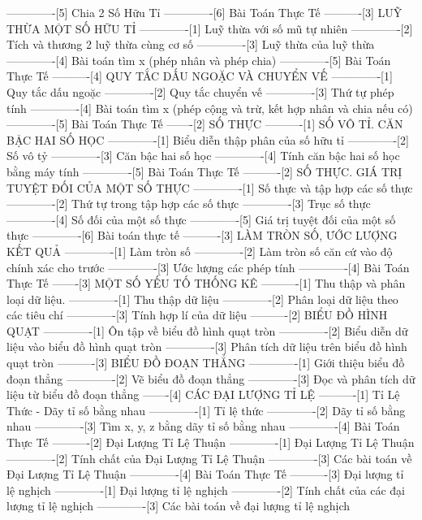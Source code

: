 -------------[5] Chia 2 Số Hữu Tỉ
-------------[6] Bài Toán Thực Tế
----------[3] LUỸ THỪA MỘT SỐ HỮU TỈ
-------------[1] Luỹ thừa với số mũ tự nhiên
-------------[2] Tích và thương 2 luỹ thừa cùng cơ số
-------------[3] Luỹ thừa của luỹ thừa
-------------[4] Bài toán tìm x (phép nhân và phép chia)
-------------[5] Bài Toán Thực Tế
----------[4] QUY TẮC DẤU NGOẶC VÀ CHUYỂN VẾ
-------------[1] Quy tắc dấu ngoặc
-------------[2] Quy tắc chuyển vế
-------------[3] Thứ tự phép tính
-------------[4] Bài toán tìm x (phép cộng và trừ, kết hợp nhân và chia nếu có)
-------------[5] Bài Toán Thực Tế
-------[2] SỐ THỰC
----------[1] SỐ VÔ TỈ. CĂN BẬC HAI SỐ HỌC
-------------[1] Biểu diễn thập phân của số hữu tỉ
-------------[2] Số vô tỷ
-------------[3] Căn bậc hai số học
-------------[4] Tính căn bậc hai số học bằng máy tính
-------------[5] Bài Toán Thực Tế
----------[2] SỐ THỰC. GIÁ TRỊ TUYỆT ĐỐI CỦA MỘT SỐ THỰC
-------------[1] Số thực và tập hợp các số thực
-------------[2] Thứ tự trong tập hợp các số thực
-------------[3] Trục số thực
-------------[4] Số đối của một số thực
-------------[5] Giá trị tuyệt đối của một số thực
-------------[6] Bài toán thực tế
----------[3] LÀM TRÒN SỐ, ƯỚC LƯỢNG KẾT QUẢ
-------------[1] Làm tròn số
-------------[2] Làm tròn số căn cứ vào độ chính xác cho trước
-------------[3] Ước lượng các phép tính
-------------[4] Bài Toán Thực Tế
-------[3] MỘT SỐ YẾU TỐ THỐNG KÊ
----------[1] Thu thập và phân loại dữ liệu.
-------------[1] Thu thập dữ liệu
-------------[2] Phân loại dữ liệu theo các tiêu chí
-------------[3] Tính hợp lí của dữ liệu
----------[2] BIỂU ĐỒ HÌNH QUẠT
-------------[1] Ôn tập về biểu đồ hình quạt tròn
-------------[2] Biểu diễn dữ liệu vào biểu đồ hình quạt tròn
-------------[3] Phân tích dữ liệu trên biểu đồ hình quạt tròn
----------[3] BIỂU ĐỒ ĐOẠN THẲNG
-------------[1] Giới thiệu biểu đồ đoạn thẳng
-------------[2] Vẽ biểu đồ đoạn thẳng
-------------[3] Đọc và phân tích dữ liệu từ biểu đồ đoạn thẳng
-------[4] CÁC ĐẠI LƯỢNG TỈ LỆ
----------[1] Tỉ Lệ Thức - Dãy tỉ số bằng nhau
-------------[1] Tỉ lệ thức
-------------[2] Dãy tỉ số bằng nhau
-------------[3] Tìm x, y, z bằng dãy tỉ số bằng nhau
-------------[4] Bài Toán Thực Tế
----------[2] Đại Lượng Tỉ Lệ Thuận
-------------[1] Đại Lượng Tỉ Lệ Thuận
-------------[2] Tính chất của Đại Lượng Tỉ Lệ Thuận
-------------[3] Các bài toán về Đại Lượng Tỉ Lệ Thuận
-------------[4] Bài Toán Thực Tế
----------[3] Đại lượng tỉ lệ nghịch
-------------[1] Đại lượng tỉ lệ nghịch
-------------[2] Tính chất của các đại lượng tỉ lệ nghịch
-------------[3] Các bài toán về đại lượng tỉ lệ nghịch
